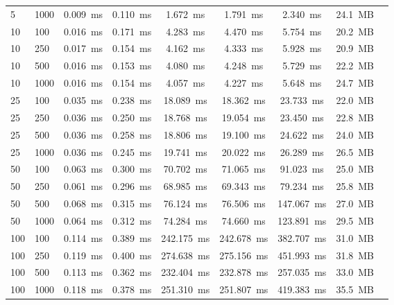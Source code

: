 \begin{table}[!t]
\begin{tabular}{llccccccc}
5 & 1000 & 0.009~ms & 0.110~ms & 1.672~ms & 1.791~ms & 2.340~ms & 24.1~MB \\
10 & 100 & 0.016~ms & 0.171~ms & 4.283~ms & 4.470~ms & 5.754~ms & 20.2~MB \\
10 & 250 & 0.017~ms & 0.154~ms & 4.162~ms & 4.333~ms & 5.928~ms & 20.9~MB \\
10 & 500 & 0.016~ms & 0.153~ms & 4.080~ms & 4.248~ms & 5.729~ms & 22.2~MB \\
10 & 1000 & 0.016~ms & 0.154~ms & 4.057~ms & 4.227~ms & 5.648~ms & 24.7~MB \\
25 & 100 & 0.035~ms & 0.238~ms & 18.089~ms & 18.362~ms & 23.733~ms & 22.0~MB \\
25 & 250 & 0.036~ms & 0.250~ms & 18.768~ms & 19.054~ms & 23.450~ms & 22.8~MB \\
25 & 500 & 0.036~ms & 0.258~ms & 18.806~ms & 19.100~ms & 24.622~ms & 24.0~MB \\
25 & 1000 & 0.036~ms & 0.245~ms & 19.741~ms & 20.022~ms & 26.289~ms & 26.5~MB \\
50 & 100 & 0.063~ms & 0.300~ms & 70.702~ms & 71.065~ms & 91.023~ms & 25.0~MB \\
50 & 250 & 0.061~ms & 0.296~ms & 68.985~ms & 69.343~ms & 79.234~ms & 25.8~MB \\
50 & 500 & 0.068~ms & 0.315~ms & 76.124~ms & 76.506~ms & 147.067~ms & 27.0~MB \\
50 & 1000 & 0.064~ms & 0.312~ms & 74.284~ms & 74.660~ms & 123.891~ms & 29.5~MB \\
100 & 100 & 0.114~ms & 0.389~ms & 242.175~ms & 242.678~ms & 382.707~ms & 31.0~MB \\
100 & 250 & 0.119~ms & 0.400~ms & 274.638~ms & 275.156~ms & 451.993~ms & 31.8~MB \\
100 & 500 & 0.113~ms & 0.362~ms & 232.404~ms & 232.878~ms & 257.035~ms & 33.0~MB \\
100 & 1000 & 0.118~ms & 0.378~ms & 251.310~ms & 251.807~ms & 419.383~ms & 35.5~MB \\
\bottomrule
\end{tabular}
\end{table}